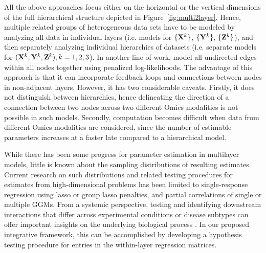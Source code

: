 All the above approaches focus either on the horizontal or the vertical dimensions of the full hierarchical structure depicted in Figure~\ref{fig:multi2layer}. Hence, multiple related groups of heterogeneous data sets have to be modeled by analyzing all data in individual layers (i.e. models for $\{ {\mathbf{X}}^k \}$, $\{ {\mathbf{Y}}^k \}$, $\{ {\mathbf{Z}}^k \}$), and then separately analyzing individual hierarchies of datasets (i.e. separate models for $({\mathbf{X}}^k, {\mathbf{Y}}^k, {\mathbf{Z}}^k), k = 1,2,3$). In another line of work, \citet{KlingEtal15,ZhangOuyangZhao17} model all undirected edges within all nodes together using penalized log-likelihoods. The advantage of this approach is that it can incorporate feedback loops and connections between nodes in non-adjacent layers. However, it has two considerable caveats. Firstly, it does not distinguish between hierarchies, hence delineating the direction of a connection between two nodes across two
different Omics modalities is not possible in such models. Secondly, computation becomes difficult when data from different Omics modalities are considered, since the number of estimable parameters increases at a faster late compared to a hierarchical model.%

While there has been some progress for parameter estimation in multilayer models, little is known about the sampling distributions of resulting estimates. Current research on such distributions and related testing procedures for estimates from high-dimensional problems has been limited to single-response regression using lasso \citep{ZhangZhang14,JavanmardMontanari14,JavanmardMontanari18,vanDeGeerEtal14} or group lasso \citep{MitraZhang16} penalties, and partial correlations of single \citep{CaiLiu16} or multiple \citep{BelilovskyEtal16,Liu17} GGMs. From a systemic perspective, testing and identifying downstream interactions that differ across experimental conditions or disease subtypes can offer important insights on the underlying biological process \citep{MaoEtal17,LiEtal15}. In our proposed integrative framework, this can be accomplished by developing a hypothesis testing procedure for entries in the within-layer regression matrices.

